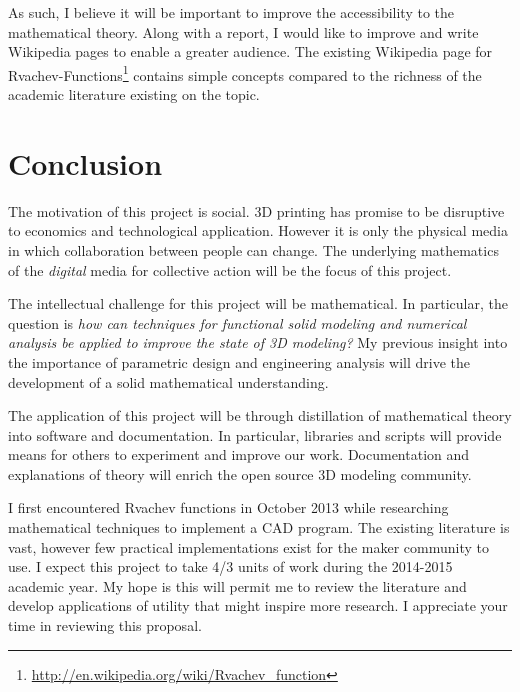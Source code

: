 \documentclass[a4paper]{article}
\begin{document}
As such, I believe it will be important to improve the accessibility to the mathematical theory. Along with a report, I would like to improve and write Wikipedia pages to enable a greater audience. The existing Wikipedia page for Rvachev-Functions\footnote{\url{http://en.wikipedia.org/wiki/Rvachev_function}} contains simple concepts compared to the richness of the academic literature existing on the topic.


\section{Conclusion}
The motivation of this project is social. 3D printing has promise to be disruptive to economics and technological application. However it is only the physical media in which collaboration between people can change. The underlying mathematics of the \emph{digital} media for collective action will be the focus of this project. 

The intellectual challenge for this project will be mathematical.  In particular, the question is \emph{how can techniques for functional solid modeling and numerical analysis be applied to improve the state of 3D modeling?} My previous insight into the importance of parametric design and engineering analysis will drive the development of a solid mathematical understanding.

The application of this project will be through distillation of mathematical theory into software and documentation. In particular, libraries and scripts will provide means for others to experiment and improve our work. Documentation and explanations of theory will enrich the open source 3D modeling community. 

I first encountered Rvachev functions in October 2013 while researching mathematical techniques to implement a CAD program. The existing literature is vast, however few practical implementations exist for the maker community to use. I expect this project to take 4/3 units of work during the 2014-2015 academic year. My hope is this will permit me to review the literature and develop applications of utility that might inspire more research. I appreciate your time in reviewing this proposal.


\end{document}
